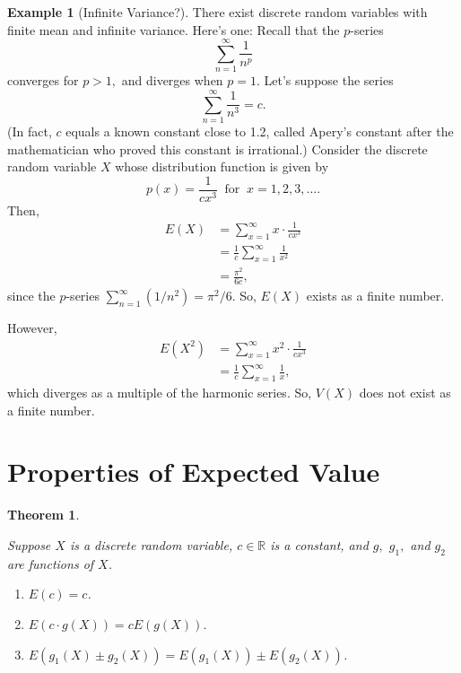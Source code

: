 \documentclass[
]{book}
\providecommand{\tightlist}{%
  \setlength{\itemsep}{0pt}\setlength{\parskip}{0pt}}
\newtheorem{theorem}{Theorem}[chapter]
\theoremstyle{definition}
\theoremstyle{definition}
\newtheorem{example}{Example}[chapter]
\theoremstyle{definition}
\theoremstyle{definition}
\theoremstyle{remark}
\begin{document}
\begin{example}[Infinite Variance?]
\protect\hypertarget{exm:infinite-variance}{}\label{exm:infinite-variance}There exist discrete random variables with finite mean and infinite variance. Here's one: Recall that the \(p\)-series \[\sum_{n=1}^\infty \frac{1}{n^p}\] converges for \(p > 1,\) and diverges when \(p = 1\). Let's suppose the series \[\sum_{n=1}^\infty \frac{1}{n^3} = c.\]
(In fact, \(c\) equals a known constant close to 1.2, called Apery's constant after the mathematician who proved this constant is irrational.) Consider the discrete random variable \(X\) whose distribution function is given by \[p(x) = \frac{1}{cx^3} ~\text{ for }~ x = 1, 2, 3, \ldots.\]
Then,
\begin{align*}
E(X) &= \sum_{x=1}^\infty x \cdot \frac{1}{cx^3}\\
    &= \frac{1}{c} \sum_{x=1}^\infty \frac{1}{x^2} \\
    &= \frac{\pi^2}{6c},
\end{align*}
since the \(p\)-series \(\sum_{n=1}^\infty (1/n^2) = \pi^2/6.\) So, \(E(X)\) exists as a finite number.

However,
\begin{align*}
E(X^2) &= \sum_{x=1}^\infty x^2 \cdot \frac{1}{cx^3}\\
    &= \frac{1}{c} \sum_{x=1}^\infty \frac{1}{x},
\end{align*}
which diverges as a multiple of the harmonic series. So, \(V(X)\) does not exist as a finite number.
\end{example}

\section{Properties of Expected Value}\label{properties-of-expected-value}

\begin{theorem}
\protect\hypertarget{thm:EV-properties-discrete}{}\label{thm:EV-properties-discrete}

Suppose \(X\) is a discrete random variable, \(c \in \mathbb{R}\) is a constant, and \(g,\) \(g_1,\) and \(g_2\) are functions of \(X\).

\begin{enumerate}
\def\labelenumi{\arabic{enumi}.}
\tightlist
\item
  \(E(c) = c\).
\item
  \(E(c\cdot g(X))= cE(g(X))\).
\item
  \(E(g_1(X) \pm g_2(X)) = E(g_1(X))\pm E(g_2(X))\).
\end{enumerate}

\end{theorem}
\end{document}
